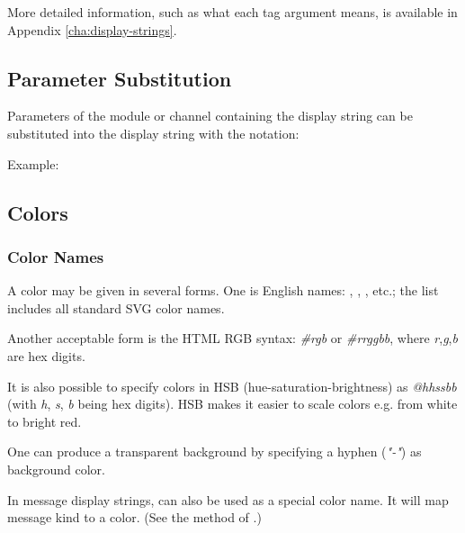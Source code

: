 More detailed information, such as what each tag argument means, is
available in Appendix \ref{cha:display-strings}.


\subsection{Parameter Substitution}
\label{sec:graphics:displaystring-parameter-substitution}

Parameters of the module or channel containing the
display string can be substituted into the display string
with the  notation:

Example:


\subsection{Colors}
\label{sec:graphics:displaystring-colors}

\subsubsection{Color Names}
\label{sec:graphics:displaystring-color-names}

A color may be given in several forms. One is English names: ,
, , etc.; the list includes all standard SVG
color names.

Another acceptable form is the HTML RGB syntax: \textit{\#rgb} or
\textit{\#rrggbb}, where \textit{r},\textit{g},\textit{b} are hex digits.

It is also possible to specify colors in HSB (hue-saturation-brightness) as
\textit{@hhssbb} (with \textit{h}, \textit{s}, \textit{b} being hex digits).
HSB makes it easier to scale colors e.g. from white to bright red.

One can produce a transparent background by specifying a hyphen (\textit{"-"})
as background color.

In message display strings,  can also be used as a special color
name. It will map message kind to a color. (See the 
method of .)

